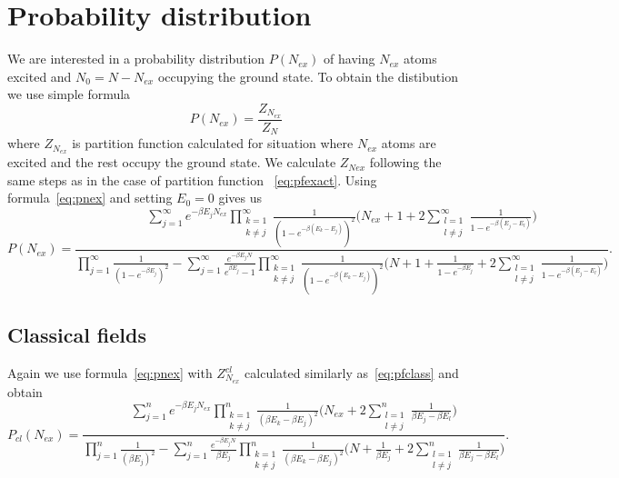 \documentclass[aps,pra,reprint]{revtex4-2}
\begin{document}
\section{Probability distribution}
We are interested in a probability distribution $P(N_{ex})$  of having $N_{ex}$ 
atoms excited and $N_0=N-N_{ex}$ occupying the ground state. To obtain 
the distibution we use simple formula~\cite{Weiss1997}
\begin{equation}
\label{eq:pnex}
P(N_{ex}) = \frac{Z_{N_{ex}}}{Z_N}
\end{equation}
where $Z_{N_{ex}}$ is partition function calculated for situation where 
$N_{ex}$ atoms are excited and the rest occupy the ground state. We calculate 
$Z_{N{ex}}$ following the same steps as in the case of partition function
~\eqref{eq:pfexact}. Using formula~\eqref{eq:pnex} and setting $E_0=0$ gives us 
\begin{equation}
P(N_{ex}) = \frac{\sum_{j=1}^{\infty} e^{-\beta E_j N_{ex}} 
\prod_{\substack{k=1 \\ k \neq j}}^{\infty} \frac{1}{(1-e^{-\beta(E_k-E_j)})^2} 
\bigg(N_{ex} + 1 + 2\sum_{\substack{l=1 \\ l \neq j}}^{\infty} 
\frac{1}{1-e^{-\beta(E_j-E_l)}} \bigg)}
{\prod _{j=1}^{\infty} \frac{1}{(1-e^{-\beta E_j})^2} - 
\sum_{j=1}^{\infty}\frac{e^{-\beta E_j N}}{e^{ \beta E_j}-1} 
\prod_{\substack{k=1 \\ k \neq j}}^{\infty} \frac{1}{(1-e^{-\beta(E_k-E_j)})^2} 
\bigg(N + 1 + \frac{1}{1-e^{-\beta E_j}} + 
2\sum_{\substack{l=1 \\ l \neq j}}^{\infty} 
\frac{1}{1-e^{-\beta(E_j-E_l)}} \bigg)}.
\end{equation}

\subsection*{Classical fields}
Again we use formula~\eqref{eq:pnex} with $Z^{cl}_{N_{ex}}$ calculated 
similarly as~\eqref{eq:pfclass} and obtain 
\begin{equation}
P_{cl}(N_{ex}) = \frac{\sum_{j=1}^n e^{-\beta E_j N_{ex}} 
\prod_{\substack{k=1 \\ k \neq j}}^n \frac{1}{(\beta E_k-\beta E_j)^2} 
\bigg(N_{ex} + 2\sum_{\substack{l=1 \\ l \neq j}}^n 
\frac{1}{\beta E_j-\beta E_l}\bigg)}
{\prod_{j=1}^n \frac{1}{(\beta E_j)^2} - 
\sum_{j=1}^n \frac{e^{-\beta E_j N}}{\beta E_j} 
\prod_{\substack{k=1 \\ k \neq j}}^n \frac{1}{(\beta E_k-\beta E_j)^2}
\bigg(N + \frac{1}{\beta E_j} + 2\sum_{\substack{l=1 \\ l \neq j}}^n 
\frac{1}{\beta E_j-\beta E_l}\bigg)}.
\end{equation}
\end{document}
